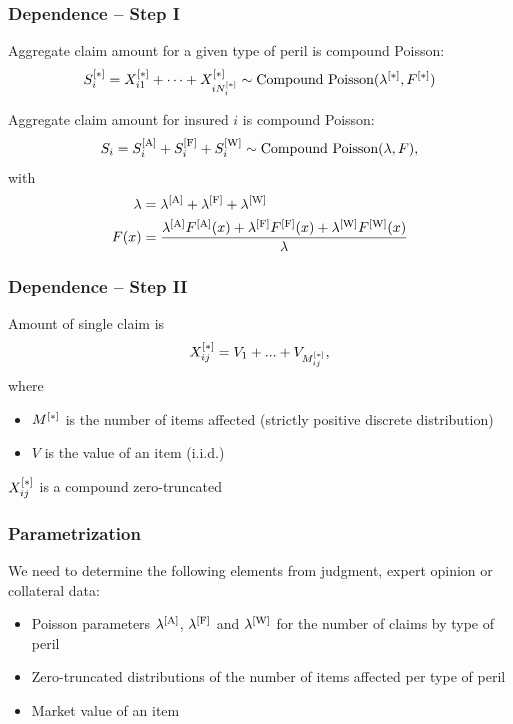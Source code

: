 \begin{frame}
  \frametitle{Dependence -- Step I}

  \begin{assumption}
    Aggregate claim amount for a given type of peril is compound Poisson:
    \begin{equation*}
      S_i^{[\ast]} = X_{i1}^{[\ast]} + \dots + X_{iN_i^{[\ast]}}^{[\ast]}
      \sim \text{Compound Poisson}(\lambda^{[\ast]}, F^{[\ast]})
    \end{equation*}
  \end{assumption}
  \pause

  \begin{consequence}
    Aggregate claim amount for insured $i$ is compound Poisson:
    \begin{equation*}
      S_i = S_i^{[\text{A}]} + S_i^{[\text{F}]} + S_i^{[\text{W}]} \sim
      \text{Compound Poisson}(\lambda, F),
    \end{equation*}
    with
    \begin{align*}
      \lambda &= \lambda^{[\text{A}]} + \lambda^{[\text{F}]} + \lambda^{[\text{W}]} \\
      F(x) &= \frac{\lambda^{[\text{A}]} F^{[\text{A}]}(x) + \lambda^{[\text{F}]} F^{[\text{F}]}(x) +
               \lambda^{[\text{W}]} F^{[\text{W}]}(x)}{\lambda}
      \end{align*}
  \end{consequence}
\end{frame}

\begin{frame}
  \frametitle{Dependence -- Step II}

  \begin{assumption}
    Amount of single claim is
    \begin{equation*}
      X_{ij}^{[\ast]} = V_1 + ... + V_{M_{ij}^{[\ast]}},
    \end{equation*}
    where
    \begin{itemize}
    \item $M^{[\ast]}$ is the number of items affected (strictly
      positive discrete distribution)
    \item $V$ is the value of an item (i.i.d.)
    \end{itemize}
  \end{assumption}
  \pause

  \begin{consequence}
    $X_{ij}^{[\ast]}$ is a compound zero-truncated
  \end{consequence}
\end{frame}

\begin{frame}
  \frametitle{Parametrization}

  We need to determine the following elements from judgment, expert
  opinion or collateral data:
  \begin{itemize}
  \item Poisson parameters $\lambda^{[\text{A}]}$, $\lambda^{[\text{F}]}$ and
    $\lambda^{[\text{W}]}$ for the number of claims by type of peril
  \item Zero-truncated distributions of the number of items affected
    per type of peril
  \item Market value of an item
  \end{itemize}
\end{frame}

